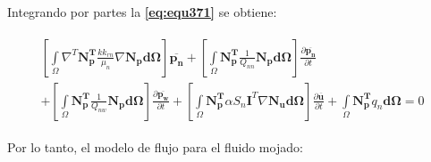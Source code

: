 \bigskip
Integrando por partes la \textbf{\ref{eq:equ371}} se obtiene:\bigskip

\begin{ceqn} 
\begin{gather} \label{eq:equ372} 
\begin{multlined}
\left[\int\limits_\Omega \nabla^T\mathbf{N_{p}^T} \frac{k k_{rn}}{\mu_{n}}\nabla \mathbf{N_p} \mathbf{d\Omega}\right]\mathbf{\overline{p_n}}  + \left[\int\limits_\Omega \mathbf{N_{p}^T}\frac{1}{Q_{nn}}\mathbf{N_p}\mathbf{d\Omega}\right]\frac{\partial \mathbf{\overline{p_n}}}{\partial t}\\[12pt] 
+ \left[\int\limits_\Omega \mathbf{N_{p}^T}\frac{1}{Q_{nw}}\mathbf{N_p}\mathbf{d\Omega}\right]\frac{\partial \mathbf{\overline{p_w}}}{\partial t} + \left[\int\limits_\Omega \mathbf{N_{p}^T}\alpha S_n\mathbf{I}^T\nabla\mathbf{N_u}\mathbf{d\Omega}\right]\frac{\partial  \mathbf{\overline{u}}}{\partial t} + \int\limits_\Omega \mathbf{N_{p}^T}q_n \mathbf{d\Omega} = 0
\end{multlined}
\end{gather} 
\end{ceqn}

\bigskip
Por lo tanto, el modelo de flujo para el fluido mojado:

